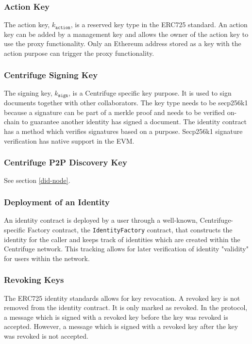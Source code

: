 \subsubsection{Action Key} 
The action key, $k_\mathtt{action}$, is a reserved key type in the ERC725 standard. An action key can be added by a management key and allows the owner of the action key to use the proxy functionality.  Only an Ethereum address stored as a key with the action purpose can trigger the proxy functionality. \\
\subsubsection{Centrifuge Signing Key}
The signing key, $k_\mathtt{sign}$, is a Centrifuge specific key purpose. It is used to sign documents together with other collaborators. The key type needs to be secp256k1 because a signature can be part of a merkle proof and needs to be verified on-chain to guarantee another identity has signed a document. The identity contract has a method which verifies signatures based on a purpose. Secp256k1 signature verification has native support in the EVM.
\subsubsection{Centrifuge P2P Discovery Key}
See section \ref{did-node}.
\subsubsection{Deployment of an Identity}
An identity contract is deployed by a user through a well-known, Centrifuge-specific Factory contract, the  \texttt{IdentityFactory} contract, that constructs the identity for the caller and keeps track of identities which are created within the Centrifuge network. This tracking allows for later verification of identity "validity" for users within the network.
\subsubsection{Revoking Keys}
The ERC725 identity standards allows for key revocation. A revoked key is not removed from the identity contract. It is only marked as revoked. In the protocol, a message which is signed with a revoked key before the key was revoked is accepted. However, a message which is signed with a revoked key after the key was revoked is not accepted.






